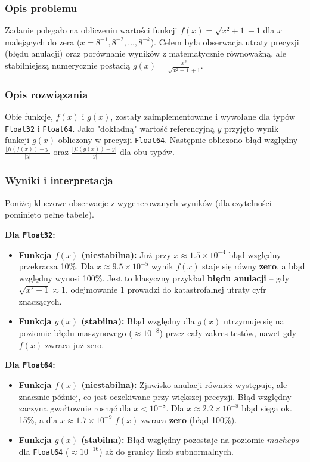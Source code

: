 \documentclass[12pt,a4paper]{article}
\begin{document}
\subsubsection{Opis problemu}
Zadanie polegało na obliczeniu wartości funkcji $f(x) = \sqrt{x^2 + 1} - 1$ dla $x$ malejących do zera ($x = 8^{-1}, 8^{-2}, \ldots, 8^{-k}$). Celem była obserwacja utraty precyzji (błędu anulacji) oraz porównanie wyników z matematycznie równoważną, ale stabilniejszą numerycznie postacią $g(x) = \frac{x^2}{\sqrt{x^2 + 1} + 1}$.

\subsubsection{Opis rozwiązania}
Obie funkcje, $f(x)$ i $g(x)$, zostały zaimplementowane i wywołane dla typów \texttt{Float32} i \texttt{Float64}. Jako "dokładną" wartość referencyjną $y$ przyjęto wynik funkcji $g(x)$ obliczony w precyzji \texttt{Float64}. Następnie obliczono błąd względny $\frac{|\textit{fl}(f(x)) - y|}{|y|}$ oraz $\frac{|\textit{fl}(g(x)) - y|}{|y|}$ dla obu typów.

\subsubsection{Wyniki i interpretacja}
Poniżej kluczowe obserwacje z wygenerowanych wyników (dla czytelności pominięto pełne tabele).

\noindent \textbf{Dla \texttt{Float32}:}
\begin{itemize}
    \item \textbf{Funkcja $f(x)$ (niestabilna):} Już przy $x \approx 1.5 \times 10^{-4}$ błąd względny przekracza 10\%. Dla $x \approx 9.5 \times 10^{-5}$ wynik $f(x)$ staje się równy \textbf{zero}, a błąd względny wynosi 100\%. Jest to klasyczny przykład \textbf{błędu anulacji} – gdy $\sqrt{x^2 + 1} \approx 1$, odejmowanie $1$ prowadzi do katastrofalnej utraty cyfr znaczących.
    \item \textbf{Funkcja $g(x)$ (stabilna):} Błąd względny dla $g(x)$ utrzymuje się na poziomie błędu maszynowego ($\approx 10^{-8}$) przez cały zakres testów, nawet gdy $f(x)$ zwraca już zero.
\end{itemize}

\noindent \textbf{Dla \texttt{Float64}:}
\begin{itemize}
    \item \textbf{Funkcja $f(x)$ (niestabilna):} Zjawisko anulacji również występuje, ale znacznie później, co jest oczekiwane przy większej precyzji. Błąd względny zaczyna gwałtownie rosnąć dla $x < 10^{-8}$. Dla $x \approx 2.2 \times 10^{-8}$ błąd sięga ok. 15\%, a dla $x \approx 1.7 \times 10^{-9}$ $f(x)$ zwraca \textbf{zero} (błąd 100\%).
    \item \textbf{Funkcja $g(x)$ (stabilna):} Błąd względny pozostaje na poziomie $macheps$ dla \texttt{Float64} ($\approx 10^{-16}$) aż do granicy liczb subnormalnych.
\end{itemize}
\end{document}

